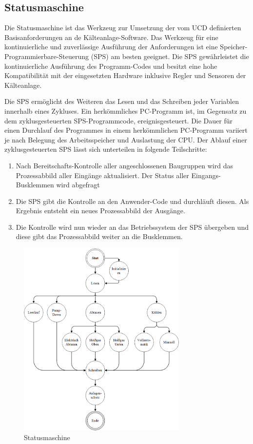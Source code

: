 \subsection{Statusmaschine}
\label{subsec:Statusmaschine}

Die Statusmaschine ist das Werkzeug zur Umsetzung der vom UCD definierten Basisanforderungen an de Kälteanlage-Software. Das Werkzeug für eine kontinuierliche und zuverlässige Ausführung der Anforderungen ist eine Speicher-Programmierbare-Steuerung (SPS) am besten geeignet. Die SPS gewährleistet die kontinuierliche Ausführung des Programm-Codes und besitzt eine hohe Kompatibilität mit der eingesetzten Hardware inklusive Regler und Sensoren der Kälteanlage. 

Die SPS ermöglicht des Weiteren das Lesen und das Schreiben jeder Variablen innerhalb eines Zykluses. Ein herkömmliches PC-Programm ist, im Gegensatz zu dem zyklusgesteuerten SPS-Programmcode, ereignisgesteuert. Die Dauer für einen Durchlauf des Programmes in einem herkömmlichen PC-Programm variiert je nach Belegung des Arbeitsspeicher und Auslastung der CPU. Der Ablauf einer zyklusgesteuerten SPS lässt sich unterteilen in folgende Teilschritte:

\begin{enumerate}
\item	Nach Bereitschafts-Kontrolle aller angeschlossenen Baugruppen wird das Prozessabbild aller Eingänge aktualisiert. Der Status aller Eingangs-Busklemmen wird abgefragt
\item 	Die SPS gibt die Kontrolle an den Anwender-Code und durchläuft diesen. Als Ergebnis entsteht ein neues Prozessabbild der Ausgänge. 
\item	Die Kontrolle wird nun wieder an das Betriebssystem der SPS übergeben und diese gibt das Prozessabbild weiter an die Busklemmen. 
\end{enumerate}


\begin{figure}[htb]
\centering		\includegraphics[width=0.75\textwidth]{Pictures/SM.png}
\caption{Statusmaschine}
\label{fig:SM}
\end{figure}


